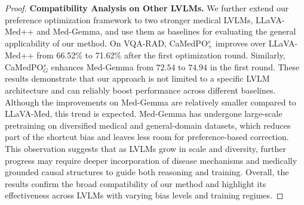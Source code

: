 \begin{proof}
\noindent\textbf{Compatibility Analysis on Other LVLMs.}
We further extend our preference optimization framework to two stronger medical LVLMs, LLaVA-Med++ and Med-Gemma, and use them as baselines for evaluating the general applicability of our method. On VQA-RAD, CaMedPO$^{s}_{+}$ improves over LLaVA-Med++ from 66.52\% to 71.62\% after the first optimization round. Similarly, CaMedPO$^{s}_{G}$ enhances Med-Gemma from $72.54$ to $74.94$ in the first round. These results demonstrate that our approach is not limited to a specific LVLM architecture and can reliably boost performance across different baselines. Although the improvements on Med-Gemma are relatively smaller compared to LLaVA-Med, this trend is expected. Med-Gemma has undergone large-scale pretraining on diversified medical and general-domain datasets, which reduces part of the shortcut bias and leaves less room for preference-based correction. This observation suggests that as LVLMs grow in scale and diversity, further progress may require deeper incorporation of disease mechanisms and medically grounded causal structures to guide both reasoning and training. Overall, the results confirm the broad compatibility of our method and highlight its effectiveness across LVLMs with varying bias levels and training regimes.

\begin{table}[t]
\centering
\caption{Performance analysis of sample ratio of causal pairs on VQA-RAD and IU-Xray.}
\label{tab:ratio_ablation}

\end{table}




\end{proof}
